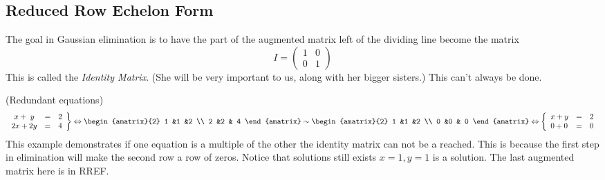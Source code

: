 \subsection{Reduced Row Echelon Form}
The goal in Gaussian elimination is to have the part of the augmented matrix left of the dividing line become the matrix
 \[I=    \begin{pmatrix}
      1             &0  \\
      0             &1
    \end{pmatrix}\] 
This is called the \emph{Identity Matrix}.  
(She will be very important to us, along with her bigger sisters.)
%
This can't always be done.

\begin{example} (Redundant equations)
\[
   \left.
\begin{array}{lcr}
	\ x + \ y & = & 2 \\
	2x + 2y & = &  4
     \end{array}
   \right\} 
   \Leftrightarrow
\begin{amatrix}{2}
1 &1 &2 \\ 2 &2 & 4
\end{amatrix}
\sim
\begin{amatrix}{2}
1 &1 &2 \\ 0 &0 & 0
\end{amatrix}
\Leftrightarrow
\left\{
\begin{array}{lcr}
	x + y & = & 2 \\
	 0 + 0 & = &  0
     \end{array}
   \right.
\]
This example demonstrates if one equation is a multiple of the other the identity matrix can not be a reached. This is because the first step in elimination will make the second row a row of zeros. Notice that solutions still exists $x=1,y=1$ is a solution. The last augmented matrix here is in RREF.
\end{example}

